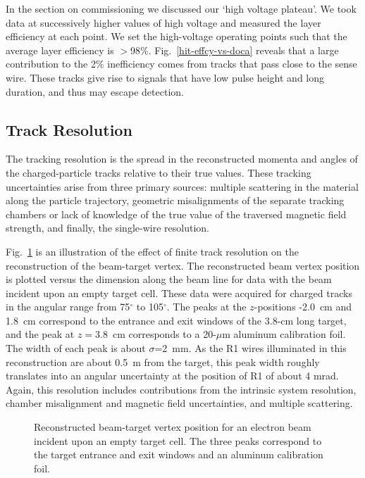 In the section on commissioning we discussed our `high voltage plateau'.
We took data at successively higher values of high voltage and measured the
layer efficiency at each point.  We set the high-voltage operating points such that
the average layer efficiency is $>$98$\%$. 
Fig.~\ref{hit-effcy-vs-doca} reveals that a large contribution to the 2$\%$ inefficiency comes 
from tracks that pass close to the sense wire.  These tracks give rise to signals 
that have low pulse height and long duration, and thus may escape detection.

\subsection{Track Resolution}

\hskip 0.15in
The tracking resolution is the spread in the reconstructed
momenta and angles of the charged-particle tracks relative to their true values.
These tracking uncertainties arise from three primary sources: multiple scattering 
in the material along the particle trajectory, geometric misalignments of the separate 
tracking chambers or lack of knowledge 
of the true value of the traversed magnetic field strength, and finally, the  
single-wire resolution.  

Fig.~\ref{zvertex} is an illustration of the effect of finite track resolution
on the reconstruction of the beam-target vertex.
The reconstructed beam
vertex position is plotted versus the dimension along the beam
line for data with the beam incident upon an empty 
target cell.  These data were acquired for charged tracks in the angular range from 
75$^{\circ}$ to 105$^{\circ}$.  The peaks at the $z$-positions -2.0~cm and 1.8~cm 
correspond to the entrance and exit windows of the 3.8-cm long target, and the peak 
at $z=3.8$~cm corresponds to a 20-$\mu$m aluminum calibration foil.  The width of 
each peak is about $\sigma$=2~mm.  As the R1 wires illuminated in this reconstruction 
are about 0.5~m from the target, this peak width roughly translates into an angular 
uncertainty at the position of R1 of about 4 mrad.  Again, this resolution includes
contributions from the intrinsic system resolution, chamber misalignment and magnetic
field uncertainties, and multiple scattering.
  
\begin{figure}[htpb]
\vspace{5cm} 
\caption{\small{Reconstructed beam-target vertex position for an electron beam
incident upon an empty target cell.  The three peaks correspond to the
target entrance and exit windows and an aluminum calibration foil.}}
\label{zvertex}
\end{figure}


